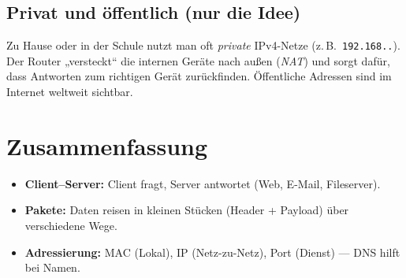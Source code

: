 \documentclass[../skript/main.tex]{subfiles}
\begin{document}
	\subsection*{Privat und öffentlich (nur die Idee)}
	Zu Hause oder in der Schule nutzt man oft \emph{private} IPv4-Netze (z.\,B.\ \texttt{192.168.\*.\*}).
	Der Router „versteckt“ die internen Geräte nach außen (\emph{NAT}) und sorgt dafür, dass Antworten
	zum richtigen Gerät zurückfinden. Öffentliche Adressen sind im Internet weltweit sichtbar.
	
	\section*{Zusammenfassung}
	\begin{itemize}
		\item \textbf{Client–Server:} Client fragt, Server antwortet (Web, E-Mail, Fileserver).
		\item \textbf{Pakete:} Daten reisen in kleinen Stücken (Header + Payload) über verschiedene Wege.
		\item \textbf{Adressierung:} MAC (Lokal), IP (Netz-zu-Netz), Port (Dienst) — DNS hilft bei Namen.
	\end{itemize}
	
\end{document}

